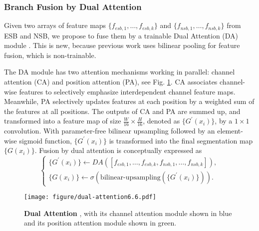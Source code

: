 \subsubsection{Branch Fusion by Dual Attention}\label{sssec:fusion}


Given two arrays of feature maps $\{f_{esb,1},\ldots,f_{esb,k}\}$ and $\{f_{nsb,1}, \ldots, f_{nsb,k}\}$ from ESB and NSB, we propose to fuse them by a trainable Dual Attention (DA) module \cite{danet}. This is new, because previous work \cite{2018rgbn} uses bilinear pooling for feature fusion, which is non-trainable.

The DA module has two attention mechanisms working in parallel: channel attention (CA) and position attention (PA), see Fig. \ref{fig:da}. CA  associates channel-wise  features to selectively emphasize interdependent channel feature maps. Meanwhile, PA selectively updates features at each position by a weighted sum of the features at all positions. The outputs of CA and PA are summed up, and transformed into a feature map of size $\frac{W}{16}\times \frac{H}{16}$, denoted as $\{G^{'}(x_{i})\}$, by a $1 \times 1$ convolution. With parameter-free bilinear upsampling followed by an element-wise sigmoid function, $\{G^{'}(x_{i})\}$ is transformed into the final segmentation map $\{ G(x_{i})\}$. Fusion by dual attention is conceptually expressed as
\begin{equation}
\left\{\! {\begin{array}{*{5}{l}}
\{G^{'}\!(x_{i})\} \!\leftarrow\! DA([f_{esb,1}\!, \!\ldots \!,\!f_{esb,k},\!f_{nsb,1}, \ldots ,f_{nsb,k}]),\\

\{ G(x_{i})\} \!\leftarrow\! \sigma (\mbox{bilinear-upsampling}( \{G^{'}(x_{i})\} )).
\end{array}} \right.\label{eq:da}
\end{equation}




\begin{figure}[htpb]
    \begin{center}
    \texttt{[image: figure/dual-attention6.6.pdf]}
    \end{center}
    \caption{\textbf{Dual Attention }, with its channel attention module shown in blue and its position attention module shown in green.}
    \label{fig:da}
\end{figure}








